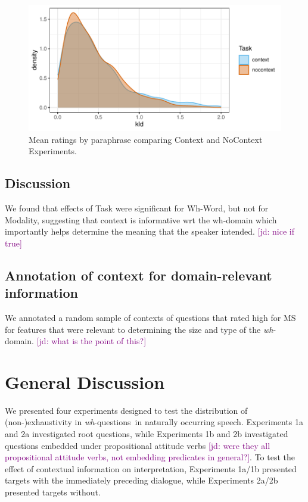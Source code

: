 \documentclass[12pt,letterpaper,table,svgnames,dvipsnames]{article}
\newcommand{\jd}[1]{\textcolor{Purple}{[jd: #1]}}
\newcommand{\whqs}{\emph{wh}-questions~}
\begin{document}
\begin{figure}[h!]
\centering
\centering
\includegraphics[scale=1]{figures/denisty_kld_context.pdf}
\caption{Mean ratings by paraphrase comparing Context and NoContext Experiments.}
\label{density_kld_overall}
\end{figure}


\subsection{Discussion}
We found that effects of Task were significant for Wh-Word, but not for Modality, suggesting that context is informative wrt the wh-domain which importantly helps determine the meaning that the speaker intended.  \jd{nice if true}


\subsection{Annotation of context for domain-relevant information}
We annotated a random sample of contexts of questions that rated high for MS for features that were relevant to determining the size and type of the \emph{wh}-domain. \jd{what is the point of this?}

\section{General Discussion}

We presented four experiments designed to test the distribution of (non-)exhaustivity in \whqs in naturally occurring speech. Experiments 1a and 2a investigated root questions, while Experiments 1b and 2b investigated questions embedded under propositional attitude verbs \jd{were they all propositional attitude verbs, not embedding predicates in general?}. To test the effect of contextual information on interpretation, Experiments 1a/1b presented targets with the immediately preceding dialogue, while Experiments 2a/2b presented targets without.
\end{document}

